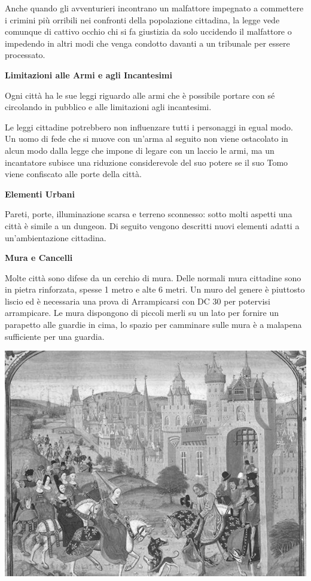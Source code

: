 \documentclass[a4paper,twoside,openany]{book}
\begin{document}
\begin{multicols}{2}
Anche quando gli avventurieri incontrano un malfattore impegnato a commettere i crimini più orribili nei confronti della popolazione cittadina, la legge vede comunque di cattivo occhio chi si fa giustizia da solo uccidendo il malfattore o impedendo in altri modi che venga condotto davanti a un tribunale per essere processato.

\textbf{Limitazioni alle Armi e agli Incantesimi}

Ogni città ha le sue leggi riguardo alle armi che è possibile portare con sé circolando in pubblico e alle limitazioni agli incantesimi.

Le leggi cittadine potrebbero non influenzare tutti i personaggi in egual modo. Un uomo di fede che si muove con un'arma al seguito non viene ostacolato in alcun modo dalla legge che impone di legare con un laccio le armi, ma un incantatore subisce una riduzione considerevole del suo potere se il suo Tomo viene confiscato alle porte della città.

\textbf{Elementi Urbani}

Pareti, porte, illuminazione scarsa e terreno sconnesso: sotto molti aspetti una città è simile a un dungeon. Di seguito vengono descritti nuovi elementi adatti a un'ambientazione cittadina.

\textbf{Mura e Cancelli}

Molte città sono difese da un cerchio di mura. Delle normali mura cittadine sono in pietra rinforzata, spesse 1 metro e alte 6 metri. Un muro del genere è piuttosto liscio ed è necessaria una prova di Arrampicarsi con DC 30 per potervisi arrampicare. Le mura dispongono di piccoli merli su un lato per fornire un parapetto alle guardie in cima, lo spazio per camminare sulle mura è a malapena sufficiente per una guardia.


\medskip

\begin{center}
\includegraphics[width=0.85\linewidth]{immagini/muraparigi.png}


\end{center}
\end{multicols}
\end{document}
